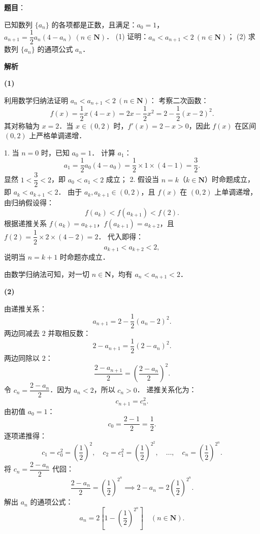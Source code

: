 \begin{answer}

\textbf{题目}：

已知数列 $\{a_n\}$ 的各项都是正数，且满足：$a_0 = 1$，$a_{n+1} = \dfrac{1}{2}a_n(4 - a_n)\ (n \in \mathbf{N})$．
(1) 证明：$a_n < a_{n+1} < 2\ (n \in \mathbf{N})$；
(2) 求数列 $\{a_n\}$ 的通项公式 $a_n$．

\textbf{解析}

\textbf{(1)}

利用数学归纳法证明 $a_n < a_{n+1} < 2\ (n \in \mathbf{N})$：
考察二次函数：
\nopagebreak[4]
\[
f(x) = \dfrac{1}{2}x(4 - x) = 2x - \dfrac{1}{2}x^2 = 2 - \dfrac{1}{2}(x - 2)^2.
\]
其对称轴为 $x = 2$．当 $x \in (0, 2)$ 时，$f'(x) = 2 - x > 0$，因此 $f(x)$ 在区间 $(0, 2)$ 上严格单调递增．

1. 当 $n = 0$ 时，已知 $a_0 = 1$．
   计算 $a_1$：
\nopagebreak[4]
\[
a_1 = \dfrac{1}{2}a_0(4 - a_0) = \dfrac{1}{2} \times 1 \times (4 - 1) = \dfrac{3}{2}.
\]
   显然 $1 < \dfrac{3}{2} < 2$，即 $a_0 < a_1 < 2$ 成立；
2. 假设当 $n = k$（$k \in \mathbf{N}$）时命题成立，即 $a_k < a_{k+1} < 2$．
   由于 $a_k, a_{k+1} \in (0, 2)$，且 $f(x)$ 在 $(0, 2)$ 上单调递增，由归纳假设得：
\nopagebreak[4]
\[
f(a_k) < f(a_{k+1}) < f(2).
\]
   根据递推关系 $f(a_k) = a_{k+1}$，$f(a_{k+1}) = a_{k+2}$，且 $f(2) = \dfrac{1}{2} \times 2 \times (4 - 2) = 2$．
   代入即得：
\nopagebreak[4]
\[
a_{k+1} < a_{k+2} < 2,
\]
   说明当 $n = k + 1$ 时命题亦成立．

由数学归纳法可知，对一切 $n \in \mathbf{N}$，均有 $a_n < a_{n+1} < 2$．

\textbf{(2)}

由递推关系：
\nopagebreak[4]
\[
a_{n+1} = 2 - \dfrac{1}{2}(a_n - 2)^2.
\]
两边同减去 $2$ 并取相反数：
\nopagebreak[4]
\[
2 - a_{n+1} = \dfrac{1}{2}(2 - a_n)^2.
\]
两边同除以 $2$：
\nopagebreak[4]
\[
\dfrac{2 - a_{n+1}}{2} = \left(\dfrac{2 - a_n}{2}\right)^2.
\]
令 $c_n = \dfrac{2 - a_n}{2}$．因为 $a_n < 2$，所以 $c_n > 0$．
递推关系化为：
\nopagebreak[4]
\[
c_{n+1} = c_n^2.
\]
由初值 $a_0 = 1$：
\nopagebreak[4]
\[
c_0 = \dfrac{2 - 1}{2} = \dfrac{1}{2}.
\]
逐项递推得：
\nopagebreak[4]
\[
c_1 = c_0^2 = \left(\dfrac{1}{2}\right)^2, \quad c_2 = c_1^2 = \left(\dfrac{1}{2}\right)^{2^2}, \quad \dots, \quad c_n = \left(\dfrac{1}{2}\right)^{2^n}.
\]
将 $c_n = \dfrac{2 - a_n}{2}$ 代回：
\nopagebreak[4]
\[
\dfrac{2 - a_n}{2} = \left(\dfrac{1}{2}\right)^{2^n} \implies 2 - a_n = 2\left(\dfrac{1}{2}\right)^{2^n}.
\]
解出 $a_n$ 的通项公式：
\nopagebreak[4]
\[
a_n = 2\left[1 - \left(\dfrac{1}{2}\right)^{2^n}\right] \quad (n \in \mathbf{N}).
\]



\end{answer}
